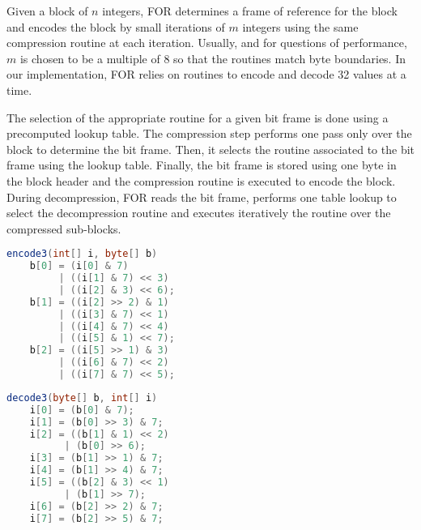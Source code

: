 Given a block of $n$ integers, FOR determines a frame of reference for the
block and encodes the block by small iterations of $m$ integers using the same
compression routine at each iteration. Usually, and for questions of
performance, $m$ is chosen to be a multiple of 8 so that the routines match
byte boundaries. In our implementation, FOR relies on routines to encode and
decode 32 values at a time.

The selection of the appropriate routine for a given bit frame is done using a
precomputed lookup table. The compression step performs one pass only over the
block to determine the bit frame. Then, it selects the routine associated to
the bit frame using the lookup table. Finally, the bit frame is stored using
one byte in the block header and the compression routine is executed to encode
the block. During decompression, FOR reads the bit frame, performs one table
lookup to select the decompression routine and executes iteratively the
routine over the compressed sub-blocks.

\begin{fileformat}
  \centering
  \begin{minipage}[t]{0.47\linewidth}
\begin{lstlisting}[frame=lines,language=Java,caption=Loop unrolled compression routine that encodes 8 integers using 3 bits each,label=lst:compression-routine]
encode3(int[] i, byte[] b)
	b[0] = (i[0] & 7) 
	     | ((i[1] & 7) << 3) 
	     | ((i[2] & 3) << 6);
	b[1] = ((i[2] >> 2) & 1) 
	     | ((i[3] & 7) << 1) 
	     | ((i[4] & 7) << 4) 
	     | ((i[5] & 1) << 7);
	b[2] = ((i[5] >> 1) & 3) 
	     | ((i[6] & 7) << 2) 
	     | ((i[7] & 7) << 5);
\end{lstlisting}
  \end{minipage}
  \quad%
  \begin{minipage}[t]{0.47\linewidth}
\begin{lstlisting}[frame=lines,language=Java,caption=Loop unrolled decompression routine that decodes 8 integers represented by 3 bits each,label=lst:decompression-routine]
decode3(byte[] b, int[] i)
	i[0] = (b[0] & 7);
	i[1] = (b[0] >> 3) & 7;
	i[2] = ((b[1] & 1) << 2) 
	      | (b[0] >> 6);
	i[3] = (b[1] >> 1) & 7;
	i[4] = (b[1] >> 4) & 7;
	i[5] = ((b[2] & 3) << 1) 
	      | (b[1] >> 7);
	i[6] = (b[2] >> 2) & 7;
	i[7] = (b[2] >> 5) & 7;
\end{lstlisting}
  \end{minipage}
\end{fileformat}


